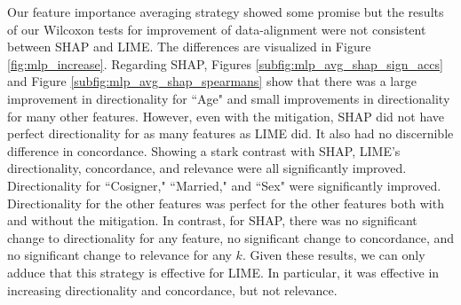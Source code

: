 \documentclass[12pt]{article}  %
\begin{document}
            Our feature importance averaging strategy showed some promise but the results of our Wilcoxon tests for improvement of data-alignment were not consistent between SHAP and LIME. The differences are visualized in Figure \ref{fig:mlp_increase}. 
             Regarding SHAP, Figures \ref{subfig:mlp_avg_shap_sign_accs} and Figure \ref{subfig:mlp_avg_shap_spearmans} show that there was a large improvement in directionality for ``Age" and small improvements in directionality for many other features. However, even with the mitigation, SHAP did not have perfect directionality for as many features as LIME did.  It also had no discernible difference in concordance. 
            Showing a stark contrast with SHAP, LIME's directionality, concordance, and relevance were all significantly improved. Directionality for ``Cosigner," ``Married," and ``Sex" were significantly improved. Directionality for the other features was perfect for the other features both with and without the mitigation. In contrast, for SHAP, there was no significant change to directionality for any feature, no significant change to concordance, and no significant change to relevance for any $k$.  Given these results, we can only adduce that this strategy is effective for LIME. In particular, it was effective in increasing directionality and concordance, but not relevance.  %
            
            
\end{document}

